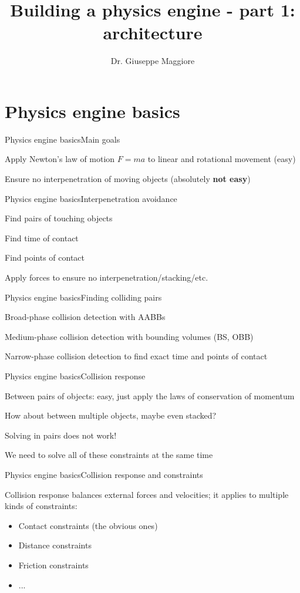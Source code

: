 \documentclass{beamer}
\title{Building a physics engine - part 1: architecture}
\author{Dr. Giuseppe Maggiore}
\institute{NHTV University of Applied Sciences \\ 
Breda, Netherlands}
\date{}
\begin{document}
\maketitle

\section{Physics engine basics}
\begin{slide}{Physics engine basics}{Main goals}{
\item Apply Newton's law of motion $F = ma$ to linear and rotational movement (easy)
\item Ensure no interpenetration of moving objects (absolutely \textbf{not easy})
}\end{slide}

\begin{slide}{Physics engine basics}{Interpenetration avoidance}{
\item Find pairs of touching objects
\item Find time of contact
\item Find points of contact
\item Apply forces to ensure no interpenetration/stacking/etc.
}\end{slide}

\begin{slide}{Physics engine basics}{Finding colliding pairs}{
\item Broad-phase collision detection with AABBs
\item Medium-phase collision detection with bounding volumes (BS, OBB)
\item Narrow-phase collision detection to find exact time and points of contact
}\end{slide}

\begin{slide}{Physics engine basics}{Collision response}{
\item Between pairs of objects: easy, just apply the laws of conservation of momentum
\item How about between multiple objects, maybe even stacked?
\item Solving in pairs does not work!
\item We need to solve all of these constraints at the same time
}\end{slide}

\begin{slide}{Physics engine basics}{Collision response and constraints}{
\item Collision response balances external forces and velocities; it applies to multiple kinds of constraints:
\begin{itemize}
\item Contact constraints (the obvious ones)
\item Distance constraints
\item Friction constraints
\item ...
\end{itemize}
}\end{slide}
\end{document}
